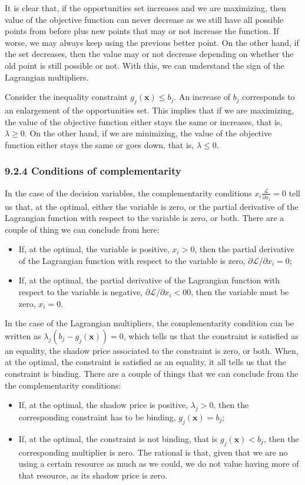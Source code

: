 \documentclass[0pt, a4paper]{article}
\newcommand{\Lagr}{\mathcal{L}}
\begin{document}
It is clear that, if the opportunities set increases and we are maximizing, then value of the objective function can never decrease as we still have all possible points from before plus new points that may or not increase the function. If worse, we may always keep using the previous better point. On the other hand, if the set decreases, then the value may or not decrease depending on whether the old point is still possible or not. With this, we can understand the sign of the Lagrangian multipliers.

Consider the inequality constraint $g_j(\textbf{x})\leq b_j$. An increase of $b_j$ corresponds to an enlargement of the opportunities set. This implies that if we are 
maximizing, the value of the objective function either stays the same or increases, that is, $\lambda\geq0$. On the other hand, if we are minimizing, the value of the objective function either stays the same or goes down, that is, $\lambda\leq0$.

\subsubsection*{9.2.4 Conditions of complementarity}

In the case of the decision variables, the complementarity conditions $x_i\frac{\Lagr}{\partial x_i}=0$ tell us that, at the optimal, either the variable is zero, or the partial derivative of the Lagrangian function with respect to the variable is zero, or both. There are a couple of thing we can conclude from here:
\begin{itemize}
	\item If, at the optimal, the variable is positive, $x_i>0$, then the partial derivative of the Lagrangian function with respect to the variable is zero, $\partial\Lagr/\partial x_i=0$;
	\item If, at the optimal, the partial derivative of the Lagrangian function with respect to the variable is negative, $\partial\Lagr/\partial x_i<00$, then the variable must be zero, $x_i=0$.
\end{itemize}

In the case of the Lagrangian multipliers, the complementarity condition can be written as $\lambda_j(b_j-g_j(\textbf{x}))=0$, which tells us that the constraint is satisfied as an equality, the shadow price associated to the constraint is zero, or both. When, at the optimal, the constraint is satisfied as an equality, it all tells us that the constraint is binding. There are a couple of things that we can conclude from the the complementarity conditions:
\begin{itemize}
	\item If, at the optimal, the shadow price is positive, $\lambda_j>0$, then the corresponding constraint has to be binding, $g_j(\textbf{x})=b_j$;
	\item If, at the optimal, the constraint is not binding, that is $g_j(\textbf{x})<b_j$, then the corresponding multiplier is zero. The rational is that, given that we are no using a certain resource as much as we could, we do not value having more of that resource, as its shadow price is zero.
\end{itemize}
\end{document}
